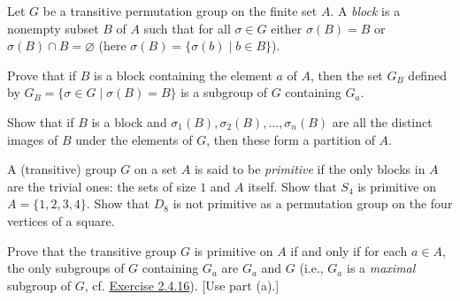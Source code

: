 \begin{specialexercise}
	Let $G$ be a transitive permutation group on the finite set $A$. A \emph{block} is a nonempty subset $B$ of $A$ such that for all $\sigma \in G$ either $\sigma(B) = B$ or $\sigma(B) \cap B = \varnothing$ (here $\sigma(B) = \{\sigma(b) \mid b \in B\}$). 
	\begin{subproblems}
		\item Prove that if $B$ is a block containing the element $a$ of $A$, then the set $G_B$ defined by $G_B = \{\sigma \in G \mid \sigma(B) = B\}$ is a subgroup of $G$ containing $G_a$.
		\item Show that if $B$ is a block and $\sigma_1(B), \sigma_2(B), \ldots, \sigma_n(B)$ are all the distinct images of $B$ under the elements of $G$, then these form a partition of $A$.
		\item A (transitive) group $G$ on a set $A$ is said to be \emph{primitive} if the only blocks in $A$ are the trivial ones: the sets of size $1$ and $A$ itself. Show that $S_4$ is primitive on $A = \{1,2,3,4\}$. Show that $D_8$ is not primitive as a permutation group on the four vertices of a square.
		\item Prove that the transitive group $G$ is primitive on $A$ if and only if for each $a \in A$, the only subgroups of $G$ containing $G_a$ are $G_a$ and $G$ (i.e., $G_a$ is a \emph{maximal} subgroup of $G$, cf. \hyperref[ex2.4.16]{Exercise 2.4.16}). [Use part (a).]
	\end{subproblems}
\end{specialexercise}

